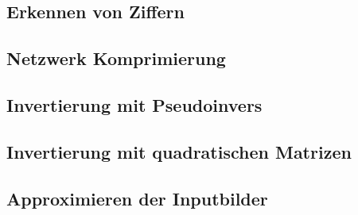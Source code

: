 \documentclass[Interploate_hadwritten_Digits.tex.tex]{subfiles}
\begin{document}
	\subsection{Erkennen von Ziffern}
	
	\subsection{Netzwerk Komprimierung}
	\label{sec:results_compression}
	
	\subsection{Invertierung mit Pseudoinvers}
	
	\subsection{Invertierung mit quadratischen Matrizen}
	
	\subsection{Approximieren der Inputbilder}
	
	
\end{document}
